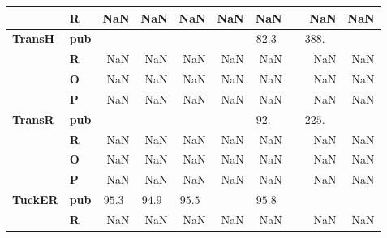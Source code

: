 \begin{tabular}{llrrrrrrr}
       & \textbf{R} &                NaN &                NaN &                NaN &         NaN &                NaN &                             NaN &      NaN \\\midrule
\textbf{TransH} & \textbf{pub} &                    &                    &                    &             &  $82.3\phantom{0}$ &  $\phantom{00}388.\phantom{00}$ &          \\
       & \textbf{R} &                NaN &                NaN &                NaN &         NaN &                NaN &                             NaN &      NaN \\
       & \textbf{O} &                NaN &                NaN &                NaN &         NaN &                NaN &                             NaN &      NaN \\
       & \textbf{P} &                NaN &                NaN &                NaN &         NaN &                NaN &                             NaN &      NaN \\\midrule
\textbf{TransR} & \textbf{pub} &                    &                    &                    &             &  $92.\phantom{00}$ &  $\phantom{00}225.\phantom{00}$ &          \\
       & \textbf{R} &                NaN &                NaN &                NaN &         NaN &                NaN &                             NaN &      NaN \\
       & \textbf{O} &                NaN &                NaN &                NaN &         NaN &                NaN &                             NaN &      NaN \\
       & \textbf{P} &                NaN &                NaN &                NaN &         NaN &                NaN &                             NaN &      NaN \\\midrule
\textbf{TuckER} & \textbf{pub} &  $95.3\phantom{0}$ &  $94.9\phantom{0}$ &  $95.5\phantom{0}$ &             &  $95.8\phantom{0}$ &                                 &          \\
       & \textbf{R} &                NaN &                NaN &                NaN &         NaN &                NaN &                             NaN &      NaN \\
\bottomrule
\end{tabular}

